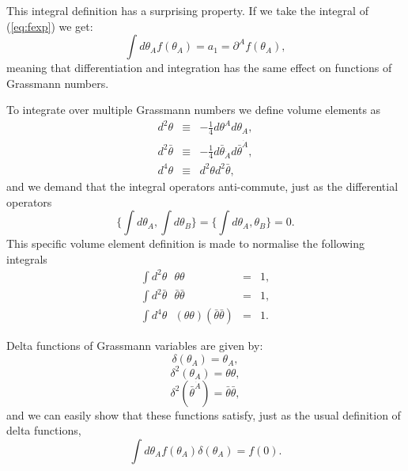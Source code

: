 \documentclass[notes.tex]{subfiles}
\begin{document}

This integral definition has a surprising property. If we take the integral of (\ref{eq:fexp}) we get:
\[\int d\theta_A f(\theta_A) = a_1 = \partial^A f(\theta_A),\]
meaning that differentiation and integration has the same effect on functions of Grassmann numbers.

To integrate over multiple Grassmann numbers we define volume elements as
\begin{eqnarray*}
d^2\theta &\equiv& -\frac{1}{4}d\theta^Ad\theta_A,\\
d^2\bar{\theta} &\equiv& -\frac{1}{4}d\bar{\theta}_{\dot{A}}d\bar{\theta}^{\dot{A}},\\
d^4\theta &\equiv& d^2\theta d^2\bar{\theta},
\end{eqnarray*}
and we demand that the integral operators anti-commute, just as the differential operators
\[ \{\int d\theta_A,\int d\theta_B\}=\{\int d\theta_A,\theta_B\}=0.\]
This specific volume element definition is made to normalise the following integrals
\begin{eqnarray*}
\int d^2\theta\text{ }\theta\theta &=& 1,\\
\int d^2\bar{\theta}\text{ }\bar{\theta} \bar{\theta} &=& 1,\\
\int d^4 \theta \text{ }(\theta\theta)(\bar{\theta} \bar{\theta}) &=& 1.
\end{eqnarray*}

Delta functions of Grassmann variables are given by:
\[\delta(\theta_A) = \theta_A,\]
\[\delta^2(\theta_A) = \theta\theta,\]
\[\delta^2(\bar{\theta}^{\dot{A}}) = \bar{\theta}\bar{\theta},\]
and we can easily show that these functions satisfy, just as the usual definition of delta functions,
\[\int d\theta_A f(\theta_A)\delta(\theta_A) = f(0).\]



\end{document}
